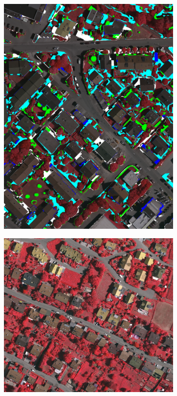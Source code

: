 \begin{figure}[H]
\begin{subfigure}{0.325\columnwidth}
  \includegraphics[width=1\linewidth]{fig/vai/30_diff_auto.png}
\end{subfigure}
\begin{subfigure}{0.325\columnwidth}
  \centering
  \includegraphics[width=1\linewidth]{fig/vai/13.JPG} 

\end{subfigure}
\end{figure}
